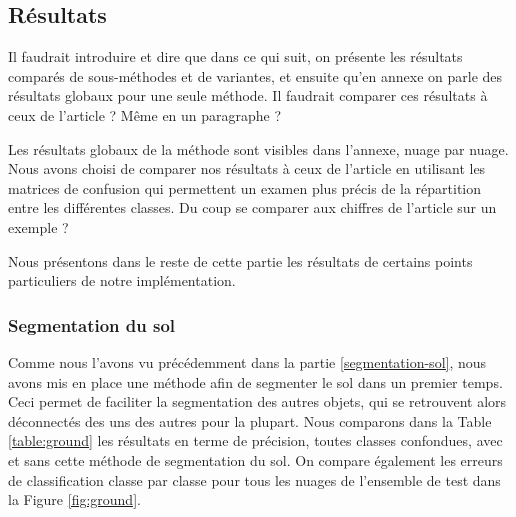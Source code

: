 \documentclass[a4paper, onecolumn, 11pt]{article}
\newcommand{\TODO}{\fbox{\textcolor{red}{TODO}}}
\begin{document}
\subsection{Résultats}

\TODO Il faudrait introduire et dire que dans ce qui suit, on présente les résultats comparés de sous-méthodes et de variantes, et ensuite qu'en annexe on parle des résultats globaux pour une seule méthode. Il faudrait comparer ces résultats à ceux de l'article ? Même en un paragraphe ?

Les résultats globaux de la méthode sont visibles dans l'annexe, nuage par nuage. Nous avons choisi de comparer nos résultats à ceux de l'article \cite{aka_article} en utilisant les matrices de confusion qui permettent un examen plus précis de la répartition entre les différentes classes. \TODO Du coup se comparer aux chiffres de l'article sur un exemple ?

Nous présentons dans le reste de cette partie les résultats de certains points particuliers de notre implémentation.

\subsubsection{Segmentation du sol}

Comme nous l'avons vu précédemment dans la partie \ref{segmentation-sol}, nous avons mis en place une méthode afin de segmenter le sol dans un premier temps. Ceci permet de faciliter la segmentation des autres objets, qui se retrouvent alors déconnectés des uns des autres pour la plupart. Nous comparons dans la Table \ref{table:ground} les résultats en terme de précision, toutes classes confondues, avec et sans cette méthode de segmentation du sol. On compare également les erreurs de classification classe par classe pour tous les nuages de l'ensemble de test dans la Figure \ref{fig:ground}.
\end{document}
